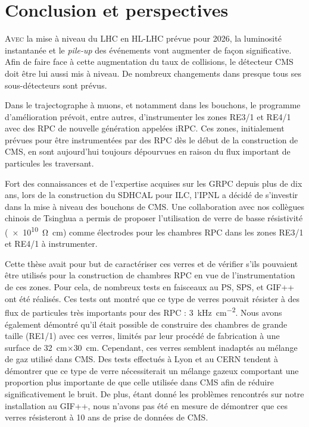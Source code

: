 \chapter{Conclusion et perspectives}
\renewcommand\chapterillustration{CON/CON}
\ThisULCornerWallPaper{1}{\chapterillustration}
\vspace*{-0.5cm}
\lettrine[lines=4, slope=-0.5em,nindent=10pt]{A}{vec} la mise à niveau du LHC en HL-LHC prévue pour \num{2026}, la luminosité instantanée et le \textit{pile-up} des événements vont augmenter de façon significative. Afin de faire face à cette augmentation du taux de collisions, le détecteur CMS doit être lui aussi mis à niveau. De nombreux changements dans presque tous ses sous-détecteurs sont prévus.

Dans le trajectographe à muons, et notamment dans les bouchons, le programme d'amélioration prévoit, entre autres, d'instrumenter les zones RE3/1 et RE4/1 avec des RPC de nouvelle génération appelées iRPC. Ces zones, initialement prévues pour être instrumentées par des RPC dès le début de la construction de CMS, en sont aujourd'hui toujours dépourvues en raison du flux important de particules les traversant.

Fort des connaissances et de l'expertise acquises sur les GRPC depuis plus de dix ans, lors de la construction du SDHCAL pour ILC, l'IPNL a décidé de s'investir dans la mise à niveau des bouchons de CMS. Une collaboration avec nos collègues chinois de Tsinghua a permis de proposer l'utilisation de verre de basse résistivité (\SI{e10}{\ohm\centi\meter}) comme électrodes pour les chambres RPC dans les zones RE3/1 et RE4/1 à instrumenter. 

Cette thèse avait pour but de caractériser ces verres et de vérifier s'ils pouvaient être utilisés pour la construction de chambres RPC en vue de l'instrumentation de ces zones. Pour cela, de nombreux tests en faisceaux au PS, SPS, et GIF++ ont été réalisés. Ces tests ont montré que ce type de verres pouvait résister à des flux de particules très importants pour des RPC : \SI{3}{\kilo\hertz\per\square\centi\meter}. Nous avons également démontré qu'il était possible de construire des chambres de grande taille (RE1/1) avec ces verres, limités par leur procédé de fabrication à une surface de \SI{32}{\centi\meter}$\times$\SI{30}{\centi\meter}. Cependant, ces verres semblent inadaptés au mélange de gaz utilisé dans CMS. Des tests effectués à Lyon et au CERN tendent à démontrer que ce type de verre nécessiterait un mélange gazeux comportant une proportion plus importante de  que celle utilisée dans CMS afin de réduire significativement le bruit. De plus, étant donné les problèmes rencontrés sur notre installation au GIF++, nous n'avons pas été en mesure de démontrer que ces verres résisteront à \num{10} ans de prise de données de CMS.

